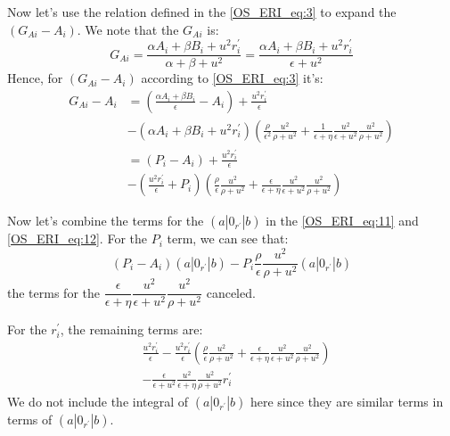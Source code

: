 Now let's use the relation defined in the \ref{OS_ERI_eq:3}
to expand the $(G_{Ai} - A_{i})$. We note that the $G_{Ai}$ is:
\begin{equation}
 G_{Ai} = \frac{\alpha A_{i} + \beta B_{i} + u^{2} r^{'}_{i}}{\alpha + \beta +
u^{2}}
 = \frac{\alpha A_{i} + \beta B_{i} + u^{2} r^{'}_{i}}{\epsilon + u^{2}}
\end{equation}
Hence, for $(G_{Ai} - A_{i})$ according to \ref{OS_ERI_eq:3} it's:
\begin{equation}
 \begin{split}
 G_{Ai} - A_{i} &= \left( \frac{\alpha A_{i} + \beta B_{i}}{\epsilon} -
A_{i}\right) +
\frac{u^{2} r^{'}_{i}}{\epsilon} \\
&-(\alpha A_{i} + \beta B_{i} + u^{2} r^{'}_{i})\left(\frac{\rho}{\epsilon^{2}}
\frac{u^{2}}{\rho+u^{2}} + \frac{1}{\epsilon+\eta}
\frac{u^{2}}{\epsilon+u^{2}}\frac{u^{2}}{\rho+u^{2}} 
\right)  \\
&= \left( P_{i} - A_{i}\right) + \frac{u^{2} r^{'}_{i}}{\epsilon} \\
&-\left( \frac{u^{2}r^{'}_{i}}{\epsilon} + P_{i}\right)
\left(\frac{\rho}{\epsilon}
\frac{u^{2}}{\rho+u^{2}} + \frac{\epsilon}{\epsilon+\eta}
\frac{u^{2}}{\epsilon+u^{2}}\frac{u^{2}}{\rho+u^{2}} 
\right) 
 \end{split}
\label{OS_ERI_eq:12}
\end{equation}

Now let's combine the terms for the $(a|0_{r^{'}}|b)$ in the \ref{OS_ERI_eq:11}
and \ref{OS_ERI_eq:12}. For the $P_{i}$ term, we can see that:
\begin{equation}
 \left( P_{i} - A_{i}\right)(a|0_{r^{'}}|b) 
-P_{i}\frac{\rho}{\epsilon}
\frac{u^{2}}{\rho+u^{2}}(a|0_{r^{'}}|b)
\label{OS_ERI_eq:13}
\end{equation}
the terms for the $\dfrac{\epsilon}{\epsilon+\eta}
\dfrac{u^{2}}{\epsilon+u^{2}}\dfrac{u^{2}}{\rho+u^{2}} $ canceled. 

For the $r_{i}^{'}$, the remaining terms are:
\begin{equation}
 \begin{split}
&\frac{u^{2} r^{'}_{i}}{\epsilon}
-\frac{u^{2}r^{'}_{i}}{\epsilon}
\left(\frac{\rho}{\epsilon}
\frac{u^{2}}{\rho+u^{2}} + \frac{\epsilon}{\epsilon+\eta}
\frac{u^{2}}{\epsilon+u^{2}}\frac{u^{2}}{\rho+u^{2}} 
\right) \\
&-\frac{\epsilon}{\epsilon+u^{2}}
\frac{u^{2}}{\epsilon+\eta}\frac{u^{2}}{\rho+u^{2}}r^{'}_{i} 
 \end{split}
\end{equation}
We do not include the integral of $(a|0_{r^{'}}|b)$ here since they are similar
terms in terms of $(a|0_{r^{'}}|b)$.

